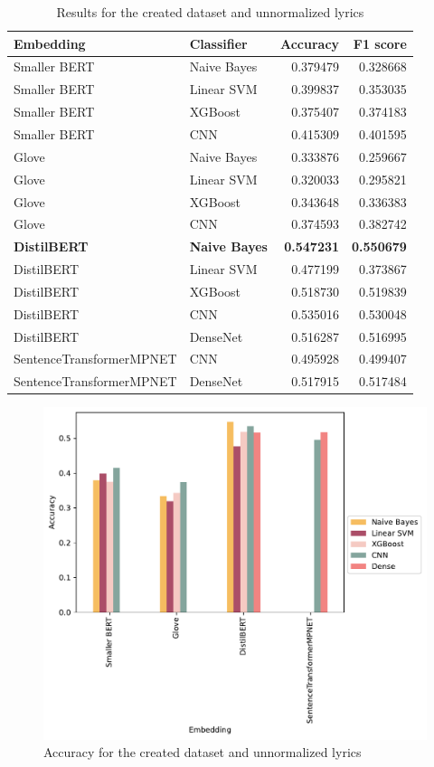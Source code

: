 \begin{table}[h]
\centering
\begin{tabular}{l|l|r|r}
\textbf{Embedding} & \textbf{Classifier} & \textbf{Accuracy} & \textbf{F1 score} \\\hline
Smaller BERT & Naive Bayes & 0.379479 & 0.328668 \\
Smaller BERT & Linear SVM & 0.399837 & 0.353035 \\
Smaller BERT & XGBoost & 0.375407 & 0.374183 \\
Smaller BERT & CNN & 0.415309 & 0.401595 \\
Glove & Naive Bayes & 0.333876 & 0.259667 \\
Glove & Linear SVM & 0.320033 & 0.295821 \\
Glove & XGBoost & 0.343648 & 0.336383 \\
Glove & CNN & 0.374593 & 0.382742 \\
\textbf{DistilBERT} & \textbf{Naive Bayes} & \textbf{0.547231} & \textbf{0.550679} \\
DistilBERT & Linear SVM & 0.477199 & 0.373867 \\
DistilBERT & XGBoost & 0.518730 & 0.519839 \\
DistilBERT & CNN & 0.535016 & 0.530048 \\
DistilBERT & DenseNet & 0.516287 & 0.516995 \\
SentenceTransformerMPNET & CNN & 0.495928 & 0.499407 \\
SentenceTransformerMPNET & DenseNet & 0.517915 & 0.517484 \\
\end{tabular}
\caption{Results for the created dataset and unnormalized lyrics}
\label{tab:dataset_res}
\end{table}

\begin{figure}
\centering
\includegraphics[width=0.8\linewidth]{plots/accuracy_dataset.pdf}
\caption{Accuracy for the created dataset and unnormalized lyrics}
\label{fig:acc_dataset}
\end{figure}


